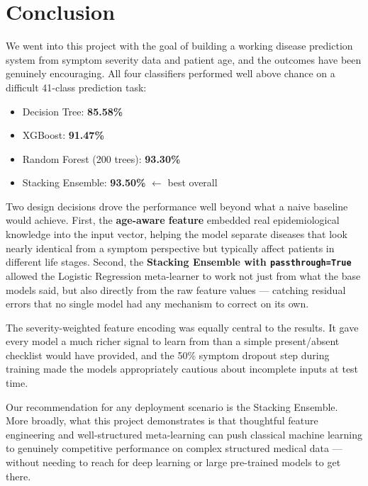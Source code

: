 \documentclass[12pt,a4paper]{article}
\begin{document}
\section{Conclusion}

We went into this project with the goal of building a working disease prediction system from symptom severity data and patient age, and the outcomes have been genuinely encouraging. All four classifiers performed well above chance on a difficult 41-class prediction task:

\begin{itemize}
    \item Decision Tree: \textbf{85.58\%}
    \item XGBoost: \textbf{91.47\%}
    \item Random Forest (200 trees): \textbf{93.30\%}
    \item Stacking Ensemble: \textbf{93.50\%} $\leftarrow$ best overall
\end{itemize}

Two design decisions drove the performance well beyond what a naive baseline would achieve. First, the \textbf{age-aware feature} embedded real epidemiological knowledge into the input vector, helping the model separate diseases that look nearly identical from a symptom perspective but typically affect patients in different life stages. Second, the \textbf{Stacking Ensemble with \texttt{passthrough=True}} allowed the Logistic Regression meta-learner to work not just from what the base models said, but also directly from the raw feature values --- catching residual errors that no single model had any mechanism to correct on its own.

The severity-weighted feature encoding was equally central to the results. It gave every model a much richer signal to learn from than a simple present/absent checklist would have provided, and the 50\% symptom dropout step during training made the models appropriately cautious about incomplete inputs at test time.

Our recommendation for any deployment scenario is the Stacking Ensemble. More broadly, what this project demonstrates is that thoughtful feature engineering and well-structured meta-learning can push classical machine learning to genuinely competitive performance on complex structured medical data --- without needing to reach for deep learning or large pre-trained models to get there.
\end{document}
